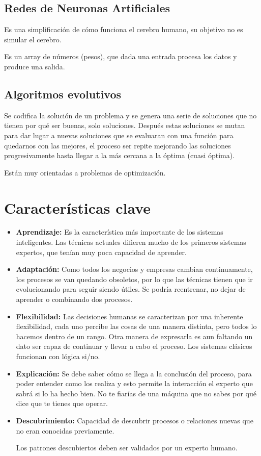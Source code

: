 \documentclass[12pt, twoside, openright]{report} %
\begin{document}
\subsection{Redes de Neuronas Artificiales}
Es una simplificación de cómo funciona el cerebro humano, su objetivo no es simular el cerebro.

Es un array de números (pesos), que dada una entrada procesa los datos y produce una salida.

\subsection{Algoritmos evolutivos}
Se codifica la solución de un problema y se genera una serie de soluciones que no tienen por qué ser buenas, solo soluciones. Después estas soluciones se mutan para dar lugar a nuevas soluciones que se evaluaran con una función para quedarnos con las mejores, el proceso ser repite mejorando las soluciones progresivamente hasta llegar a la más cercana a la óptima (cuasi óptima).

Están muy orientadas a problemas de optimización.

\section{Características clave}
\begin{itemize}
	\item \textbf{Aprendizaje:} Es la característica más importante de los sistemas inteligentes. Las técnicas actuales difieren mucho de los primeros sistemas expertos, que tenían muy poca capacidad de aprender.
	\item \textbf{Adaptación:} Como todos los negocios y empresas cambian continuamente, los procesos se van quedando obsoletos, por lo que las técnicas tienen que ir evolucionando para seguir siendo útiles. Se podría reentrenar, no dejar de aprender o combinando dos procesos.
	\item \textbf{Flexibilidad:} Las decisiones humanas se caracterizan por una inherente flexibilidad, cada uno percibe las cosas de una manera distinta, pero todos lo hacemos dentro de un rango. Otra manera de expresarla es aun faltando un dato ser capaz de continuar y llevar a cabo el proceso. Los sistemas clásicos funcionan con lógica si/no.
	\item \textbf{Explicación:} Se debe saber cómo se llega a la conclusión del proceso, para poder entender como los realiza y esto permite la interacción el experto que sabrá si lo ha hecho bien. No te fiarías de una máquina que no sabes por qué dice que te tienes que operar.
	\item \textbf{Descubrimiento:} Capacidad de descubrir procesos o relaciones nuevas que no eran conocidas previamente.

	      Los patrones descubiertos deben ser validados por un experto humano.
\end{itemize}
\end{document}
